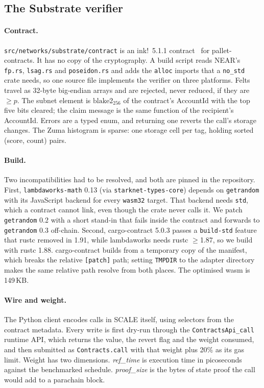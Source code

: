\documentclass[11pt]{article}
\theoremstyle{remark}
\begin{document}
\subsection{The Substrate verifier}\label{sec:substrate}

\paragraph{Contract.} \texttt{src/networks/substrate/contract} is an ink!~5.1.1 contract~\cite{ink} for pallet-contracts. It has no copy of the cryptography. A build script reads NEAR's \texttt{fp.rs}, \texttt{lsag.rs} and \texttt{poseidon.rs} and adds the \texttt{alloc} imports that a \texttt{no\_std} crate needs, so one source file implements the verifier on three platforms. Felts travel as 32-byte big-endian arrays and are rejected, never reduced, if they are $\ge p$. The subnet element is $\mathrm{blake2}_{256}$ of the contract's AccountId with the top five bits cleared; the claim message is the same function of the recipient's AccountId. Errors are a typed enum, and returning one reverts the call's storage changes. The Zuma histogram is sparse: one storage cell per tag, holding sorted (score, count) pairs.

\paragraph{Build.} Two incompatibilities had to be resolved, and both are pinned in the repository. First, \texttt{lambdaworks-math} 0.13 (via \texttt{starknet-types-core}) depends on \texttt{getrandom} with its JavaScript backend for every \texttt{wasm32} target. That backend needs \texttt{std}, which a contract cannot link, even though the crate never calls it. We patch \texttt{getrandom} 0.2 with a short stand-in that fails inside the contract and forwards to \texttt{getrandom} 0.3 off-chain. Second, cargo-contract 5.0.3 passes a \texttt{build-std} feature that rustc removed in 1.91, while lambdaworks needs rustc $\ge$1.87, so we build with rustc 1.88. cargo-contract builds from a temporary copy of the manifest, which breaks the relative \texttt{[patch]} path; setting \texttt{TMPDIR} to the adapter directory makes the same relative path resolve from both places. The optimised wasm is 149\,KB.

\paragraph{Wire and weight.} The Python client encodes calls in SCALE itself, using selectors from the contract metadata. Every write is first dry-run through the \texttt{ContractsApi\_call} runtime API, which returns the value, the revert flag and the weight consumed, and then submitted as \texttt{Contracts.call} with that weight plus 20\% as its gas limit. Weight has two dimensions. \emph{ref\_time} is execution time in picoseconds against the benchmarked schedule. \emph{proof\_size} is the bytes of state proof the call would add to a parachain block.
\end{document}
